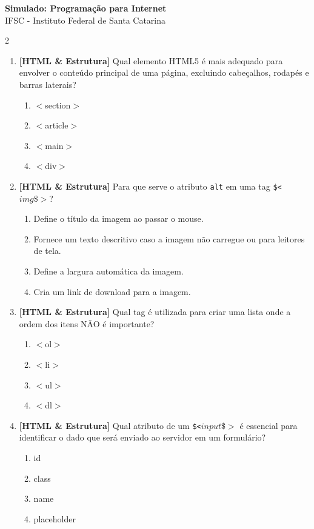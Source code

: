 \documentclass[a4paper,10pt]{article}
\begin{document}
\begin{center}
    {\Large \textbf{Simulado: Programação para Internet}} \\
    \vspace{0.1cm}
    {\small IFSC - Instituto Federal de Santa Catarina}
\end{center}

\begin{multicols*}{2}
\begin{enumerate}[label=\textbf{\arabic*.}, leftmargin=*]
\item \textbf{[HTML \& Estrutura]} Qual elemento HTML5 é mais adequado para envolver o conteúdo principal de uma página, excluindo cabeçalhos, rodapés e barras laterais?
\begin{enumerate}[label=(\alph*), noitemsep]
  \item $<$section$>$
  \item $<$article$>$
  \item $<$main$>$
  \item $<$div$>$
\end{enumerate}

\item \textbf{[HTML \& Estrutura]} Para que serve o atributo \texttt{alt} em uma tag \texttt{\$<$img\$>$}?
\begin{enumerate}[label=(\alph*), noitemsep]
  \item Define o título da imagem ao passar o mouse.
  \item Fornece um texto descritivo caso a imagem não carregue ou para leitores de tela.
  \item Define a largura automática da imagem.
  \item Cria um link de download para a imagem.
\end{enumerate}

\item \textbf{[HTML \& Estrutura]} Qual tag é utilizada para criar uma lista onde a ordem dos itens NÃO é importante?
\begin{enumerate}[label=(\alph*), noitemsep]
  \item $<$ol$>$
  \item $<$li$>$
  \item $<$ul$>$
  \item $<$dl$>$
\end{enumerate}

\item \textbf{[HTML \& Estrutura]} Qual atributo de um \texttt{\$<$input\$>$} é essencial para identificar o dado que será enviado ao servidor em um formulário?
\begin{enumerate}[label=(\alph*), noitemsep]
  \item id
  \item class
  \item name
  \item placeholder
\end{enumerate}


\end{enumerate}
\end{multicols*}
\end{document}
